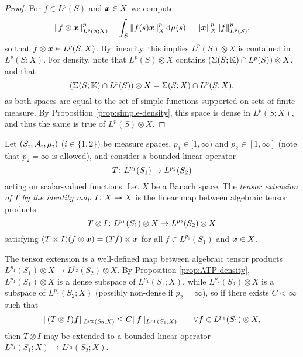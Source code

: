 \begin{proof}
  For $f \in L^p(S)$ and $\bm{x} \in X$ we compute
  \begin{equation*}
    \|f \otimes \bm{x}\|_{L^p(S;X)}^p = \int_S \|f(s)\bm{x}\|_{X}^p \, \mathrm{d}\mu(s) = \|\bm{x}\|_X^p \|f\|_{L^p(S)}^p,
  \end{equation*}
  so that $f \otimes \bm{x} \in L^p(S;X)$.
  By linearity, this implies $L^p(S) \otimes X$ is contained in $L^p(S;X)$.
  For density, note that $L^p(S) \otimes X$ contains $(\Sigma(S;\mathbb{K}) \cap L^p(S)) \otimes X$, and that
  \begin{equation*}
    (\Sigma(S;\mathbb{K}) \cap L^p(S)) \otimes X = \Sigma(S;X) \cap L^p(S;X),
  \end{equation*}
  as both spaces are equal to the set of simple functions supported on sets of finite measure.
  By Proposition \ref{prop:simple-density}, this space is dense in $L^p(S;X)$, and thus the same is true of $L^p(S) \otimes X$.
\end{proof}

\begin{defn}\label{defn:tensor-exts}
  Let $(S_i,\mathcal{A}_i,\mu_i)$ ($i \in \{1,2\}$) be measure spaces, $p_1 \in [1,\infty)$ and $p_2 \in [1,\infty]$ (note that $p_{2} = \infty$ is allowed), and consider a bounded linear operator
  \begin{equation*}
    T \colon L^{p_1}(S_{1}) \rightarrow L^{p_2}(S_{2})
  \end{equation*}
  acting on scalar-valued functions.
  Let $X$ be a Banach space.
  The \emph{tensor extension of $T$ by the identity map $I \colon X \rightarrow X$} is the linear map between algebraic tensor products
  \begin{equation*}
    T \otimes I \colon L^{p_1}(S_1) \otimes X \rightarrow L^{p_2}(S_2) \otimes X
  \end{equation*}
  satisfying $(T \otimes I)(f \otimes \bm{x}) = (Tf) \otimes \bm{x}$ for all $f \in L^{p_1}(S_1)$ and $\bm{x} \in X$.
\end{defn}

The tensor extension is a well-defined map between algebraic tensor products $L^{p_1}(S_1) \otimes X \to L^{p_2}(S_2) \otimes X$.
By Proposition \ref{prop:ATP-density}, $L^{p_1}(S_1) \otimes X$ is a dense subspace of $L^{p_1}(S_1;X)$, while $L^{p_2}(S_2) \otimes X$ is a subspace of $L^{p_2}(S_2;X)$ (possibly non-dense if $p_2 = \infty$), so if there exists $C < \infty$ such that
\begin{equation}\label{eq:tensor-ext-estimate}
  \|(T \otimes I)\bm{f}\|_{L^{p_2}(S_2;X)} \leq C \|\bm{f}\|_{L^{p_1}(S_1;X)} \qquad \forall \bm{f} \in L^{p_1}(S_1) \otimes X,
\end{equation}
then $T \otimes I$ may be extended to a bounded linear operator $L^{p_1}(S_1;X) \to L^{p_2}(S_2;X)$.

